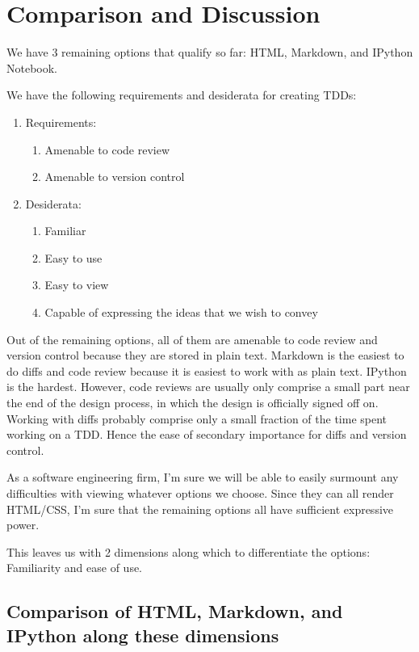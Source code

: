 \documentclass[]{article}
\begin{document}
		


\section{Comparison and Discussion}
We have 3 remaining options that qualify so far: HTML, Markdown, and IPython Notebook.

We have the following requirements and desiderata for creating TDDs:

\begin{enumerate}
	\item Requirements:
		\begin{enumerate}
			\item Amenable to code review
			\item Amenable to version control
		\end{enumerate}
	\item Desiderata:
		\begin{enumerate}
			\item Familiar
			\item Easy to use
			\item Easy to view
			\item Capable of expressing the ideas that we wish to convey			
		\end{enumerate}
\end{enumerate}

Out of the remaining options, all of them are amenable to code review and version control because they are stored in plain text.  Markdown is the easiest to do diffs and code review because it is easiest to work with as plain text.  IPython is the hardest.  However, code reviews are usually only comprise a small part near the end of the design process, in which the design is officially signed off on.  Working with diffs probably comprise only a small fraction of the time spent working on a TDD.  Hence the ease of secondary importance for diffs and version control.

As a software engineering firm, I'm sure we will be able to easily surmount any difficulties with viewing whatever options we choose.  Since they can all render HTML/CSS, I'm sure that the remaining options all have sufficient expressive power.

This leaves us with 2 dimensions along which to differentiate the options: Familiarity and ease of use.


\subsection{Comparison of HTML, Markdown, and IPython along these dimensions}
\end{document}
